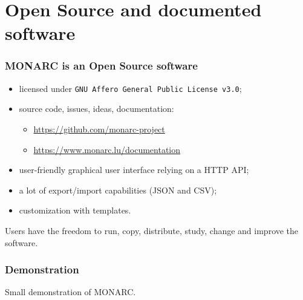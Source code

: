 \documentclass[]{beamer}
\begin{document}
\section{Open Source and documented software}
\begin{frame}
    \frametitle{MONARC is an Open Source software}
    \begin{center}
        \begin{itemize}
            \item licensed under \texttt{GNU Affero General Public License v3.0};
            \item source code, issues, ideas, documentation:
            \begin{itemize}
                \item \url{https://github.com/monarc-project}
                \item \url{https://www.monarc.lu/documentation}
            \end{itemize}
            \item user-friendly graphical user interface relying on a HTTP API;
            \item a lot of export/import capabilities (JSON and CSV);
            \item customization with templates.
        \end{itemize}
    \end{center}
    \bigskip
    Users have the freedom to run, copy, distribute, study, change and improve the software.
\end{frame}

\begin{frame}
    \frametitle{Demonstration}
    Small demonstration of MONARC.
\end{frame}
\end{document}

